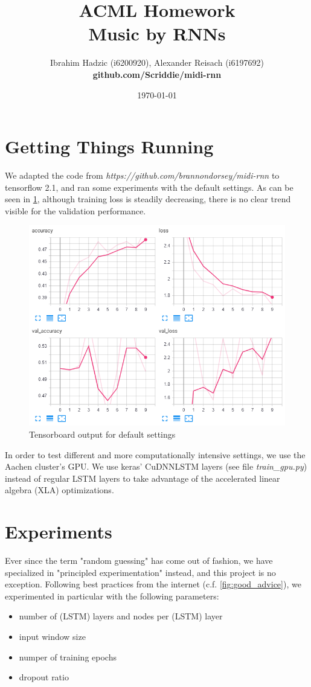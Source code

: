 \documentclass{article}
\title{ACML Homework \\ Music by RNNs}
\author{Ibrahim Hadzic (i6200920), Alexander Reisach (i6197692) \\ \textbf{github.com/Scriddie/midi-rnn}}
\date{\today}
\begin{document}
\maketitle

\section{Getting Things Running}
We adapted the code from \textit{https://github.com/brannondorsey/midi-rnn} to tensorflow 2.1, and ran some experiments with the default settings. As can be seen in \ref{fig:tensorboard_2}, although training loss is steadily decreasing, there is no clear trend visible for the validation performance.

\begin{figure}[H]
    \centering
    \includegraphics[scale=0.40]{tensorboard_2.png}
    \caption{Tensorboard output for default settings}
    \label{fig:tensorboard_2}
\end{figure}

In order to test different and more computationally intensive settings, we use the Aachen cluster's GPU. We use keras' CuDNNLSTM layers (see file \textit{train\_gpu.py}) instead of regular LSTM layers to take advantage of the accelerated linear algebra (XLA) optimizations.


\section{Experiments}
Ever since the term "random guessing" has come out of fashion, we have specialized in "principled experimentation" instead, and this project is no exception. Following best practices from the internet (c.f. \ref{fig:good_advice}), we experimented in particular with the following parameters:
\begin{itemize}
    \item number of (LSTM) layers and nodes per (LSTM) layer
    \item input window size
    \item numper of training epochs
    \item dropout ratio
\end{itemize}
\end{document}
